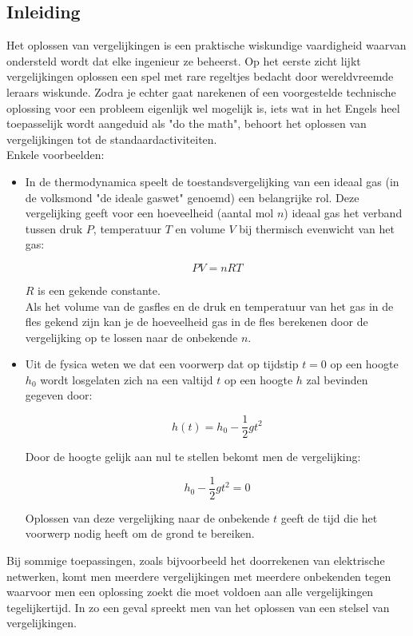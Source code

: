 \subsection*{Inleiding}

Het oplossen van vergelijkingen is een praktische wiskundige vaardigheid waarvan ondersteld wordt dat elke ingenieur ze beheerst. Op het eerste zicht lijkt vergelijkingen oplossen een spel met rare  regeltjes bedacht door wereldvreemde leraars wiskunde. Zodra je echter gaat narekenen of een voorgestelde technische oplossing voor een probleem eigenlijk wel mogelijk is, iets wat in het Engels heel toepasselijk wordt aangeduid als "do the math", behoort het oplossen van vergelijkingen tot de standaardactiviteiten.\\

Enkele voorbeelden:

\begin{itemize}

\item {In de thermodynamica speelt de toestandsvergelijking van een ideaal gas (in de volksmond "de ideale gaswet" genoemd) een belangrijke rol. Deze vergelijking geeft voor een hoeveelheid (aantal mol $n$) ideaal gas het verband tussen druk $P$, temperatuur $T$ en volume $V$ bij thermisch evenwicht van het gas:

\[ PV=nRT \]

$R$ is een gekende constante.\\
Als het volume van de gasfles en de druk en temperatuur van het gas in de fles gekend zijn kan je de hoeveelheid gas in de fles berekenen door de vergelijking op te lossen naar de onbekende $n$.}

\item {Uit de fysica weten we dat een voorwerp dat op tijdstip $t=0$ op een hoogte $h_{0}$ wordt losgelaten zich na een valtijd $t$ op een hoogte $h$ zal bevinden gegeven door:

    \[ h(t)=h_{0}-\frac{1}{2}gt^2 \]

    Door de hoogte gelijk aan nul te stellen bekomt men de vergelijking:

    \[ h_{0}-\frac{1}{2}gt^2 =0 \]

    Oplossen van deze vergelijking naar de onbekende $t$ geeft de tijd die het voorwerp nodig heeft om de grond te bereiken.}

    \end{itemize}


\noindent Bij sommige toepassingen, zoals bijvoorbeeld het doorrekenen van elektrische netwerken, komt men meerdere vergelijkingen met meerdere onbekenden tegen waarvoor men een oplossing zoekt die moet voldoen aan alle vergelijkingen tegelijkertijd. In zo een geval spreekt men van het oplossen van een stelsel van vergelijkingen.\\





